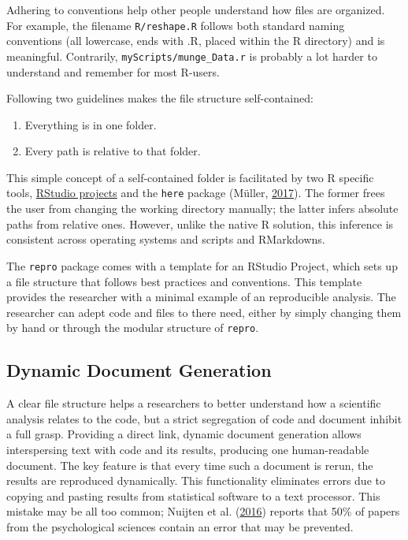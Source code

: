 \documentclass[12pt,a4paper,]{article}
\providecommand{\tightlist}{%
  \setlength{\itemsep}{0pt}\setlength{\parskip}{0pt}}
\begin{document}
Adhering to conventions help other people understand how files are organized.
For example, the filename \texttt{R/reshape.R} follows both standard naming conventions (all lowercase, ends with .R, placed within the R directory) and is meaningful. Contrarily, \texttt{myScripts/munge\_Data.r} is probably a lot harder to understand and remember for most R-users.

Following two guidelines makes the file structure self-contained:

\begin{enumerate}
\def\labelenumi{\arabic{enumi}.}
\tightlist
\item
  Everything is in one folder.
\item
  Every path is relative to that folder.
\end{enumerate}

This simple concept of a self-contained folder is facilitated by two R specific tools, \href{https://r4ds.had.co.nz/workflow-projects.html}{RStudio projects} and the \texttt{here} package (Müller, \protect\hyperlink{ref-R-here}{2017}).
The former frees the user from changing the working directory manually; the latter infers absolute paths from relative ones.
However, unlike the native R solution, this inference is consistent across operating systems and scripts and RMarkdowns.

The \texttt{repro} package comes with a template for an RStudio Project, which sets up a file structure that follows best practices and conventions.
This template provides the researcher with a minimal example of an reproducible analysis.
The researcher can adept code and files to there need, either by simply changing them by hand or through the modular structure of \texttt{repro}.

\hypertarget{dynamic-document-generation}{%
\subsection{Dynamic Document Generation}\label{dynamic-document-generation}}

A clear file structure helps a researchers to better understand how a scientific analysis relates to the code, but a strict segregation of code and document inhibit a full grasp.
Providing a direct link, dynamic document generation allows interspersing text with code and its results, producing one human-readable document.
The key feature is that every time such a document is rerun, the results are reproduced dynamically.
This functionality eliminates errors due to copying and pasting results from statistical software to a text processor. This mistake may be all too common; Nuijten et al. (\protect\hyperlink{ref-nuijtenPrevalenceStatisticalReporting2016}{2016}) reports that 50\% of papers from the psychological sciences contain an error that may be prevented.
\end{document}
